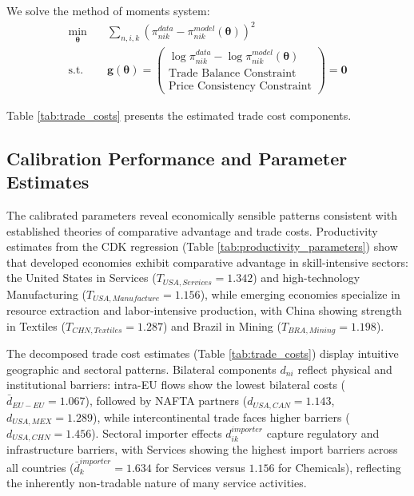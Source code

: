 We solve the method of moments system:
\begin{align*}
\min_{\boldsymbol{\theta}} &\quad \sum_{n,i,k} \left( \pi_{nik}^{data} - \pi_{nik}^{model}(\boldsymbol{\theta}) \right)^2 \\
\text{s.t.} & \quad \mathbf{g}(\boldsymbol{\theta}) = \begin{pmatrix}
\log \pi_{nik}^{data} - \log \pi_{nik}^{model}(\boldsymbol{\theta}) \\
\text{Trade Balance Constraint} \\
\text{Price Consistency Constraint}
\end{pmatrix} = \mathbf{0}
\end{align*}

Table \ref{tab:trade_costs} presents the estimated trade cost components.

\subsection{Calibration Performance and Parameter Estimates}

The calibrated parameters reveal economically sensible patterns consistent with established theories of comparative advantage and trade costs. Productivity estimates from the CDK regression (Table \ref{tab:productivity_parameters}) show that developed economies exhibit comparative advantage in skill-intensive sectors: the United States in Services ($T_{USA,Services} = 1.342$) and high-technology Manufacturing ($T_{USA,Manufacture} = 1.156$), while emerging economies specialize in resource extraction and labor-intensive production, with China showing strength in Textiles ($T_{CHN,Textiles} = 1.287$) and Brazil in Mining ($T_{BRA,Mining} = 1.198$).

The decomposed trade cost estimates (Table \ref{tab:trade_costs}) display intuitive geographic and sectoral patterns. Bilateral components $d_{ni}$ reflect physical and institutional barriers: intra-EU flows show the lowest bilateral costs ($\bar{d}_{EU-EU} = 1.067$), followed by NAFTA partners ($d_{USA,CAN} = 1.143$, $d_{USA,MEX} = 1.289$), while intercontinental trade faces higher barriers ($d_{USA,CHN} = 1.456$). Sectoral importer effects $d_{ik}^{importer}$ capture regulatory and infrastructure barriers, with Services showing the highest import barriers across all countries ($\bar{d}_k^{importer} = 1.634$ for Services versus $1.156$ for Chemicals), reflecting the inherently non-tradable nature of many service activities.

